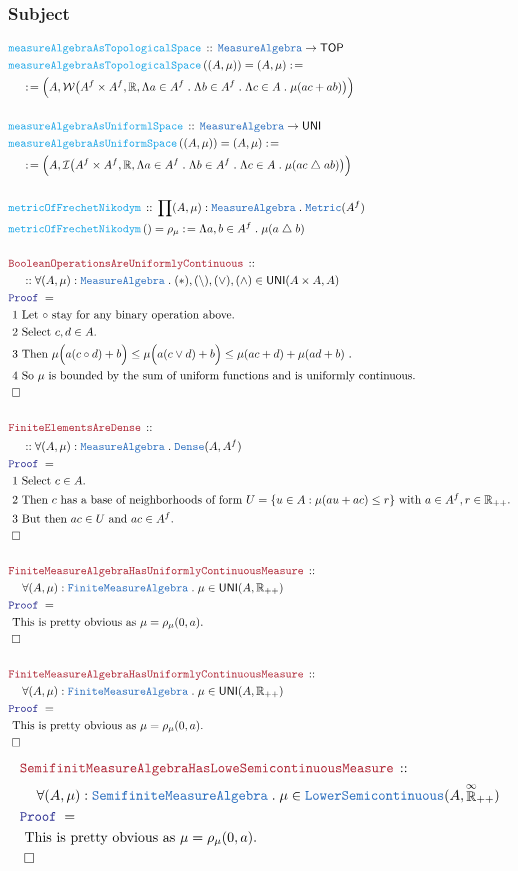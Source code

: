 \documentclass[12pt]{scrartcl}
\newcommand{\TYPE}[1]{\textcolor{NavyBlue}{\mathtt{#1}}}
\newcommand{\FUNC}[1]{\textcolor{Cerulean}{\mathtt{#1}}}
\newcommand{\LOGIC}[1]{\textcolor{Blue}{\mathtt{#1}}}
\newcommand{\THM}[1]{\textcolor{Maroon}{\mathtt{#1}}}
\renewcommand{\.}{\; . \;}
\newcommand{\de}{: \kern 0.1pc =}
\newcommand{\Act}[1]{\left( #1 \right)}
\newcommand{\Theorem}[2]{& \THM{#1} \, :: \, #2 \\ & \Proof = \\ }
\newcommand{\DeclareFunc}[2]{& \FUNC{#1} \, :: \, #2 \\}
\newcommand{\DefineNamedFunc}[4]{&  \FUNC{#1}\Act{#2} = #3 \de #4 \\}
\newcommand{\NewLine}{\\ & \kern 1pc}
\newcommand{\Page}[1]{ \begin{align*} #1 \end{align*}   }
\newcommand{\Reals}{\mathbb{R} }
\newcommand{\EReals}{\stackrel{\mathclap{\infty}}{\mathbb{R}}}
\newcommand{\du}{\; \triangle \;}
\newcommand{\QED}{\; \square}
\newcommand{\EndProof}{& \QED \\}
\newcommand{\Proof}{\LOGIC{Proof} \; }
\newcommand{\Explain}[1]{& \text{#1.} \\}
\newcommand{\Finite}{\TYPE{Finite}}
\newcommand{\Dense}{\TYPE{Dense}}
\newcommand{\TOP}{\mathsf{TOP}}
\newcommand{\UNI}{\mathsf{UNI}}
\newcommand{\Semifinite}{\TYPE{Semifinite}}
\newcommand{\MA}{\TYPE{MeasureAlgebra}}
\begin{document}
\subsubsection{Subject}
\Page{
	\DeclareFunc{measureAlgebraAsTopologicalSpace}
	{
		\MA \to \TOP
	}
	\DefineNamedFunc{measureAlgebraAsTopologicalSpace}{(A,\mu)}{(A,\mu)}
	{
		\NewLine \de 		
		\Big( A, \mathcal{W}\big(A^f \times A^f,
			\Reals, \Lambda a \in A^f \. \Lambda b \in A^f \. \Lambda c \in A \. \mu(ac + ab )\big)\Big) 
	}
	\\
	\DeclareFunc{measureAlgebraAsUniformlSpace}
	{
		\MA \to \UNI
	}
	\DefineNamedFunc{measureAlgebraAsUniformSpace}{(A,\mu)}{(A,\mu)}
	{
		\NewLine \de 		
		\Big( A, \mathcal{I}\big(A^f \times A^f,
			\Reals, \Lambda a \in A^f \. \Lambda b \in A^f \. \Lambda c \in A \. \mu(ac \du ab )\big)\Big) 
	}
	\\
	\DeclareFunc{metricOfFrechetNikodym}
	{
		\prod (A,\mu) : \MA \.  \TYPE{Metric}(A^f) 
	}
	\DefineNamedFunc{metricOfFrechetNikodym}{}{\rho_\mu}
	{
		\Lambda a,b \in A^f \. \mu(a \du b)
	}
	\\
	\Theorem{BooleanOperationsAreUniformlyContinuous}
	{
		\NewLine ::		
		\forall (A,\mu) : \MA \.  (*),(\setminus),(\vee),(\wedge) \in \UNI(A \times A, A)
	}
	\Explain{ 1 Let $\circ$ stay for any binary operation above}
	\Explain{ 2 Select $c,d \in A$}
	\Explain{ 3 Then 
		$
			\mu\Big(a(c \circ d) +  b\Big) \le 
			\mu\Big( a(c \vee d) + b \Big) \le 
			\mu( ac + d) + \mu(ad + b)
		$  }
	\Explain{ 4 So $\mu$ is bounded by the sum of uniform functions and is uniformly continuous}
	\EndProof
	\\
	\Theorem{FiniteElementsAreDense}
	{
		\NewLine ::		
		\forall (A,\mu) : \MA \.  \Dense(A,A^f)
	}
	\Explain{ 1 Select $c \in A$}
	\Explain{ 2 Then $c$ has a base of neighborhoods of form 
		$U = \{ u \in A : \mu(au + ac) \le r\}$ with $a \in A^f, r \in \Reals_{++}$}
	\Explain{ 3 But then $ac \in U$ and $ac \in A^f$}
	\EndProof
	\\
	\Theorem{FiniteMeasureAlgebraHasUniformlyContinuousMeasure}
	{
			\NewLine
			\forall (A,\mu) : \Finite\MA \. \mu \in \UNI(A,\Reals_{++})
	}
	\Explain{ This is pretty obvious as $\mu = \rho_\mu(0,a)$}
	\EndProof
	\\
	\Theorem{FiniteMeasureAlgebraHasUniformlyContinuousMeasure}
	{
			\NewLine
			\forall (A,\mu) : \Finite\MA \. \mu \in \UNI(A,\Reals_{++})
	}
	\Explain{ This is pretty obvious as $\mu = \rho_\mu(0,a)$}
	\EndProof
}\Page{
	\Theorem{SemifinitMeasureAlgebraHasLoweSemicontinuousMeasure}
	{
			\NewLine
			\forall (A,\mu) : \Semifinite\MA \. \mu \in \TYPE{LowerSemicontinuous}(A,\EReals_{++})
	}
	\Explain{ This is pretty obvious as $\mu = \rho_\mu(0,a)$}
	\EndProof
}
\newpage
\end{document}
